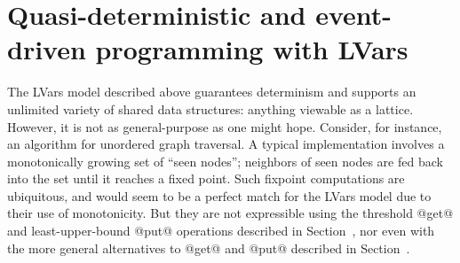 
\section{Quasi-deterministic and event-driven programming with LVars}\label{s:intro-quasi}

The LVars model described above guarantees determinism and supports an
unlimited variety of shared data structures: anything viewable as a
lattice.  However, it is not as general-purpose as one might hope.
Consider, for instance, an algorithm for unordered graph traversal.  A
typical implementation involves a monotonically growing set of ``seen
nodes''; neighbors of seen nodes are fed back into the set until it
reaches a fixed point.  Such fixpoint computations are ubiquitous, and
would seem to be a perfect match for the LVars model due to their use
of monotonicity.  But they are not expressible using the threshold
@get@ and least-upper-bound @put@ operations described in
Section~\label{s:intro-monotonic}, nor even with the more general
alternatives to @get@ and @put@ described in
Section~\label{subsection:intro-generalizing}.


